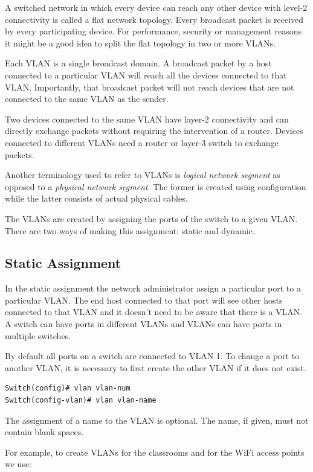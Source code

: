 A switched network in which every device can reach any other device with level-2 connectivity is called a flat network topology.
Every broadcast packet is received by every participating device.
For performance, security or management reasons it might be a good idea to split the flat topology in two or more VLANs.

Each VLAN is a single broadcast domain.
A broadcast packet by a host connected to a particular VLAN will reach all the devices connected to that VLAN.
Importantly, that broadcast packet will not reach devices that are not connected to the same VLAN as the sender.

Two devices connected to the same VLAN have layer-2 connectivity and can directly exchange packets without requiring the intervention of a router.
Devices connected to different VLANs need a router or layer-3 switch to exchange packets.

Another terminology used to refer to VLANs is \emph{logical network segment} as opposed to a \emph{physical network segment}.
The former is created using configuration while the latter consists of actual physical cables.

The VLANs are created by assigning the ports of the switch to a given VLAN.
There are two ways of making this assignment: static and dynamic.

\subsection{Static Assignment}

In the static assignment the network administrator assign a particular port to a particular VLAN.
The end host connected to that port will see other hosts connected to that VLAN and it doesn't need to be aware that there is a VLAN.
A switch can have ports in different VLANs and VLANs can have ports in multiple switches.

By default all ports on a switch are connected to VLAN 1.
To change a port to another VLAN, it is necessary to first create the other VLAN if it does not exist.

\begin{lstlisting}
Switch(config)# vlan vlan-num
Switch(config-vlan)# vlan vlan-name
\end{lstlisting}

The assignment of a name to the VLAN is optional.
The name, if given, must not contain blank spaces.

For example, to create VLANs for the classrooms and for the WiFi access points we use:

